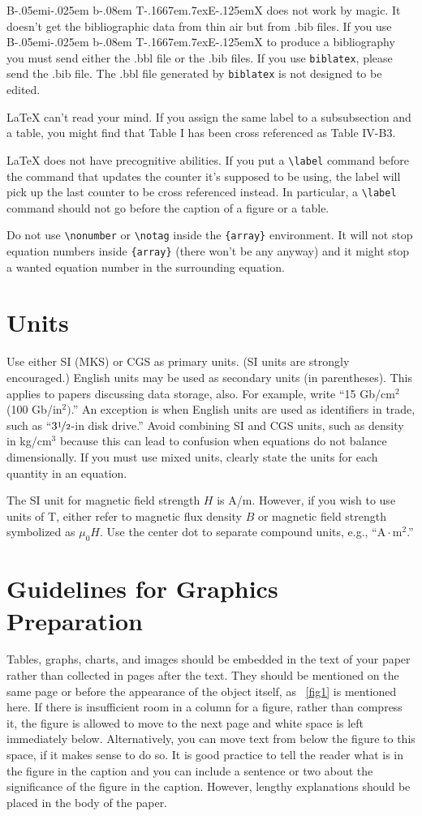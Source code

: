 \documentclass{IEEEtran}
\def\BibTeX{{\rm B\kern-.05em{\sc i\kern-.025em b}\kern-.08em
T\kern-.1667em\lower.7ex\hbox{E}\kern-.125emX}}
\begin{document}
{\BibTeX} does not work by magic. It doesn't get the bibliographic
data from thin air but from .bib files. If you use {\BibTeX} to produce a
bibliography you must send either the .bbl file or the .bib files.
If you use \texttt{biblatex}, please send the .bib file. The .bbl file
generated by \texttt{biblatex} is not designed to be edited.

{\LaTeX} can't read your mind. If you assign the same label to a
subsubsection and a table, you might find that Table I has been cross
referenced as Table IV-B3.

{\LaTeX} does not have precognitive abilities. If you put a
\verb|\label| command before the command that updates the counter it's
supposed to be using, the label will pick up the last counter to be
cross referenced instead. In particular, a \verb|\label| command
should not go before the caption of a figure or a table.

Do not use \verb|\nonumber| or \verb|\notag| inside the \verb|{array}| environment. It
will not stop equation numbers inside \verb|{array}| (there won't be
any anyway) and it might stop a wanted equation number in the
surrounding equation.

\section{Units}
Use either SI (MKS) or CGS as primary units. (SI units are strongly
encouraged.) English units may be used as secondary units (in
parentheses). This applies to papers discussing data storage, also.
For example, write ``15 Gb/cm$^{2}$ (100 Gb/in$^{2})$.'' An exception
is when English units are used as identifiers in trade, such as
``$3\nicefrac{1}{2}$-in disk drive.'' Avoid combining SI and CGS units,
such as density in kg/cm$^{3}$ because this can lead to confusion when
equations do not balance dimensionally. If you must use mixed units,
clearly state the units for each quantity in an equation.

The SI unit for magnetic field strength $H$ is A/m. However, if you wish to use
units of T, either refer to magnetic flux density $B$ or magnetic field
strength symbolized as $\mu _{0}H$. Use the center dot to separate
compound units, e.g., ``$\text{A}\cdot \text{m}^{2}$.''

\section{Guidelines for Graphics Preparation}
Tables, graphs, charts, and images should be embedded in the text of your
paper rather than collected in pages after the text. They should be
mentioned on the same page or before the appearance of the object itself, as
\figurename~\ref{fig1} is mentioned here. If there is insufficient
room in a column for a figure, rather than compress it, the figure is
allowed to move to the next page and white space is left immediately below.
Alternatively, you can move text from below the figure to this space, if it
makes sense to do so. It is good practice to tell the reader what is in the
figure in the caption and you can include a sentence or two about the
significance of the figure in the caption. However, lengthy explanations
should be placed in the body of the paper.
\end{document}
